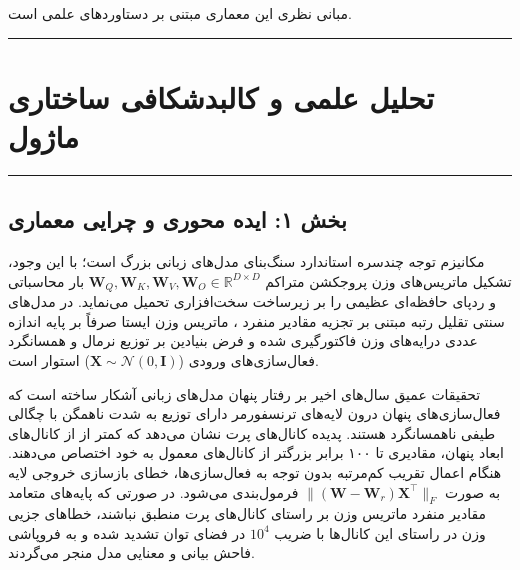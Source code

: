 \clearpage
{}
\vspace*{0.2cm}

مبانی نظری این معماری مبتنی بر دستاوردهای علمی \cite{eckart1936approximation} است.
\noindent\rule{\textwidth}{1.2pt}
\vspace*{0.1cm}
\section{تحلیل علمی و کالبدشکافی ساختاری ماژول }
\label{sec:mod_asvd_attention}
\vspace*{-0.2cm}
\noindent\rule{\textwidth}{0.5pt}
\vspace*{0.3cm}

\subsection*{بخش ۱: ایده محوری و چرایی معماری }
مکانیزم توجه چندسره استاندارد  سنگ‌بنای مدل‌های زبانی بزرگ است؛ با این وجود، تشکیل ماتریس‌های وزن پروجکشن متراکم $\mathbf{W}_Q, \mathbf{W}_K, \mathbf{W}_V, \mathbf{W}_O \in \mathbb{R}^{D \times D}$ بار محاسباتی و ردپای حافظه‌ای عظیمی را بر زیرساخت سخت‌افزاری تحمیل می‌نماید. در مدل‌های سنتی تقلیل رتبه مبتنی بر تجزیه مقادیر منفرد ، ماتریس وزن ایستا صرفاً بر پایه اندازه عددی درایه‌های وزن فاکتورگیری شده و فرض بنیادین بر توزیع نرمال و همسانگرد  فعال‌سازی‌های ورودی ($\mathbf{X} \sim \mathcal{N}(0, \mathbf{I})$) استوار است.

تحقیقات عمیق سال‌های اخیر بر رفتار پنهان مدل‌های زبانی آشکار ساخته است که فعال‌سازی‌های پنهان درون لایه‌های ترنسفورمر دارای توزیع به شدت ناهمگن با چگالی طیفی ناهمسانگرد هستند. پدیده کانال‌های پرت  نشان می‌دهد که کمتر از  از کانال‌های ابعاد پنهان، مقادیری تا ۱۰۰ برابر بزرگتر از کانال‌های معمول به خود اختصاص می‌دهند. هنگام اعمال تقریب کم‌مرتبه بدون توجه به فعال‌سازی‌ها، خطای بازسازی خروجی لایه به صورت $\|(\mathbf{W} - \mathbf{W}_r)\mathbf{X}^\top\|_F$ فرمول‌بندی می‌شود. در صورتی که پایه‌های متعامد مقادیر منفرد ماتریس وزن بر راستای کانال‌های پرت منطبق نباشند، خطاهای جزیی وزن در راستای این کانال‌ها با ضریب $10^4$ در فضای توان تشدید شده و به فروپاشی فاحش بیانی و معنایی مدل منجر می‌گردند.

